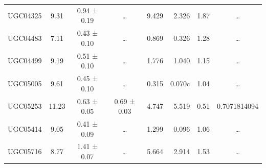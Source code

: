 \documentclass[reprint,%
 amsmath,amssymb,
 aps,
]{revtex4-1}
\begin{document}
\begin{table}[]
\begin{tabular}{cccccrrc}
\rowcolor[HTML]{F3F3F3} 
UGC04325             & 9.31                      & 0.94 ± 0.19           & …                      & 9.429                                                        & 2.326                                                           & 1.87                                                           & …                                                             \\
\rowcolor[HTML]{F3F3F3} 
UGC04483             & 7.11                      & 0.43 ± 0.10           & …                      & 0.869                                                        & 0.326                                                          & 1.28                                                           & …                                                             \\
\rowcolor[HTML]{F3F3F3} 
UGC04499             & 9.19                      & 0.51 ± 0.10           & …                      & 1.776                                                        & 1.040                                                         & 1.15                                                           & …                                                             \\
\rowcolor[HTML]{F3F3F3} 
UGC05005             & 9.61                      & 0.45 ± 0.10           & …                      & 0.315                                                        & 0.070c                                                       & 1.04                                                            & …                                                             \\
\rowcolor[HTML]{F3F3F3} 
UGC05253             & 11.23                     & 0.63 ± 0.05           & 0.69 ± 0.03            & 4.747                                                        & 5.519                                                       & 0.51                                                           & \multicolumn{1}{r}{\cellcolor[HTML]{F3F3F3}0.7071814094}      \\
\rowcolor[HTML]{F3F3F3} 
UGC05414             & 9.05                      & 0.41 ± 0.09           & …                      & 1.299                                                        & 0.096                                                          & 1.06                                                           & …                                                             \\
\rowcolor[HTML]{F3F3F3} 
UGC05716             & 8.77                      & 1.41 ± 0.07           & …                      & 5.664                                                        & 2.914                                                           & 1.53                                                           & …                                                             \\

\end{tabular}
\end{table}
\end{document}
